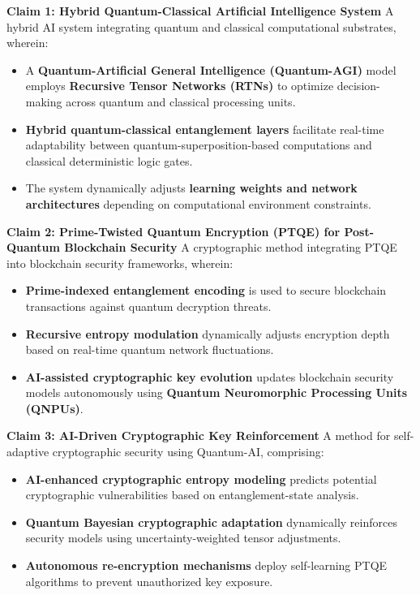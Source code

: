 \documentclass{article}
\theoremstyle{plain}
\begin{document}
\noindent \textbf{Claim 1: Hybrid Quantum-Classical Artificial Intelligence System}  
A hybrid AI system integrating quantum and classical computational substrates, wherein:

\begin{itemize}
    \item A \textbf{Quantum-Artificial General Intelligence (Quantum-AGI)} model employs \textbf{Recursive Tensor Networks (RTNs)} to optimize decision-making across quantum and classical processing units.
    \item \textbf{Hybrid quantum-classical entanglement layers} facilitate real-time adaptability between quantum-superposition-based computations and classical deterministic logic gates.
    \item The system dynamically adjusts \textbf{learning weights and network architectures} depending on computational environment constraints.
\end{itemize}

\noindent \textbf{Claim 2: Prime-Twisted Quantum Encryption (PTQE) for Post-Quantum Blockchain Security}  
A cryptographic method integrating PTQE into blockchain security frameworks, wherein:

\begin{itemize}
    \item \textbf{Prime-indexed entanglement encoding} is used to secure blockchain transactions against quantum decryption threats.
    \item \textbf{Recursive entropy modulation} dynamically adjusts encryption depth based on real-time quantum network fluctuations.
    \item \textbf{AI-assisted cryptographic key evolution} updates blockchain security models autonomously using \textbf{Quantum Neuromorphic Processing Units (QNPUs)}.
\end{itemize}

\noindent \textbf{Claim 3: AI-Driven Cryptographic Key Reinforcement}  
A method for self-adaptive cryptographic security using Quantum-AI, comprising:

\begin{itemize}
    \item \textbf{AI-enhanced cryptographic entropy modeling} predicts potential cryptographic vulnerabilities based on entanglement-state analysis.
    \item \textbf{Quantum Bayesian cryptographic adaptation} dynamically reinforces security models using uncertainty-weighted tensor adjustments.
    \item \textbf{Autonomous re-encryption mechanisms} deploy self-learning PTQE algorithms to prevent unauthorized key exposure.
\end{itemize}
\end{document}
